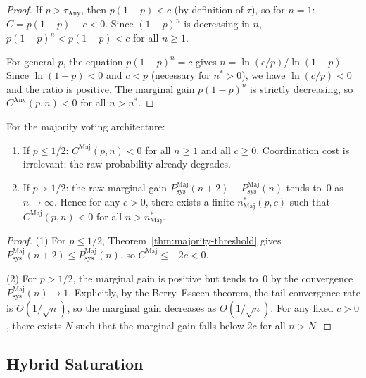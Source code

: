 \begin{proof}
If $p > \tau_{\mathrm{Any}}$, then $p(1-p) < c$ (by definition of $\tau$), so for
$n = 1$: $C = p(1-p) - c < 0$. Since $(1-p)^n$ is decreasing in $n$, $p(1-p)^n <
p(1-p) < c$ for all $n \geq 1$.

For general $p$, the equation $p(1-p)^n = c$ gives
$n = \ln(c/p)/\ln(1-p)$. Since $\ln(1-p) < 0$ and $c < p$ (necessary for
$n^* > 0$), we have $\ln(c/p) < 0$ and the ratio is positive. The marginal gain
$p(1-p)^n$ is strictly decreasing, so $C^{\mathrm{Any}}(p,n) < 0$ for all
$n > n^*$.
\end{proof}

\begin{theorem}
\label{thm:cost-dominance-maj}
For the majority voting architecture:
\begin{enumerate}
  \item If $p \leq 1/2$: $C^{\mathrm{Maj}}(p, n) < 0$ for all $n \geq 1$ and all
    $c \geq 0$. Coordination cost is irrelevant; the raw probability already degrades.
  \item If $p > 1/2$: the raw marginal gain
    $P_{\mathrm{sys}}^{\mathrm{Maj}}(n+2) - P_{\mathrm{sys}}^{\mathrm{Maj}}(n)$
    tends to~$0$ as $n \to \infty$. Hence for any $c > 0$, there exists a finite
    $n^*_{\mathrm{Maj}}(p, c)$ such that $C^{\mathrm{Maj}}(p, n) < 0$ for all
    $n > n^*_{\mathrm{Maj}}$.
\end{enumerate}
\end{theorem}

\begin{proof}
(1) For $p \leq 1/2$, Theorem~\ref{thm:majority-threshold} gives
$P_{\mathrm{sys}}^{\mathrm{Maj}}(n+2) \leq P_{\mathrm{sys}}^{\mathrm{Maj}}(n)$,
so $C^{\mathrm{Maj}} \leq -2c < 0$.

(2) For $p > 1/2$, the marginal gain is positive but tends to~$0$ by the
convergence $P_{\mathrm{sys}}^{\mathrm{Maj}}(n) \to 1$. Explicitly, by the
Berry--Esseen theorem, the tail convergence rate is
$\Theta(1/\sqrt{n})$, so the marginal gain decreases as $\Theta(1/\sqrt{n})$.
For any fixed $c > 0$, there exists $N$ such that the marginal gain falls below
$2c$ for all $n > N$.
\end{proof}

\subsection{Hybrid Saturation}
\label{subsec:hybrid}

